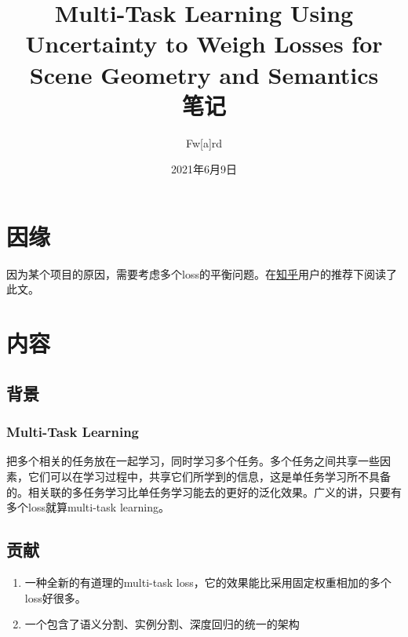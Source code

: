 \documentclass[a4paper,punct,fancyhdr]{ctexart}
\title{Multi-Task Learning Using Uncertainty to Weigh Losses for Scene Geometry and Semantics\\笔记}
\author{Fw[a]rd}
\date{2021年6月9日}
\begin{document}
\maketitle

\section{因缘}
因为某个项目的原因，需要考虑多个loss的平衡问题。在\href{https://www.zhihu.com/question/375794498}{知乎}用户的推荐下阅读了此文。

\section{内容}
\subsection{背景}
\subsubsection{Multi-Task Learning}
把多个相关的任务放在一起学习，同时学习多个任务。多个任务之间共享一些因素，它们可以在学习过程中，共享它们所学到的信息，这是单任务学习所不具备的。相关联的多任务学习比单任务学习能去的更好的泛化效果。广义的讲，只要有多个loss就算multi-task learning。

\subsection{贡献}
\begin{enumerate}
    \item 一种全新的有道理的multi-task loss，它的效果能比采用固定权重相加的多个loss好很多。
    \item 一个包含了语义分割、实例分割、深度回归的统一的架构
\end{enumerate}
\end{document}
